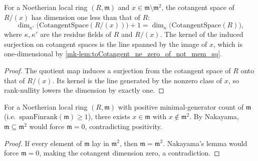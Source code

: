 \begin{lemma}\label{mk-lem:finrank_cotangentSpace_quot_span_singleton_succ}
  \leanok

  For a Noetherian local ring \((R, \mathfrak m)\) and \(x \in \mathfrak m \setminus \mathfrak m^2\),
  the cotangent space of \(R / (x)\) has dimension one less than that of \(R\):
  \[
    \dim_{\kappa'}\!\bigl(\text{CotangentSpace}(R/(x))\bigr) + 1
      = \dim_{\kappa}\!\bigl(\text{CotangentSpace}(R)\bigr),
  \]
  where \(\kappa, \kappa'\) are the residue fields of \(R\) and \(R/(x)\). The kernel of
  the induced surjection on cotangent spaces is the line spanned by the image of \(x\),
  which is one-dimensional by \ref{mk-lem:toCotangent_ne_zero_of_not_mem_sq}.
\end{lemma}
\begin{proof}
  \leanok

The quotient map induces a surjection from the cotangent space of
  \(R\) onto that of \(R/(x)\). Its kernel is the line generated by the
  nonzero class of \(x\), so rank-nullity lowers the dimension by exactly one.
\end{proof}

\begin{lemma}\label{mk-lem:exists_notMemSq_of_spanFinrank_pos}
  \leanok

  For a Noetherian local ring \((R, \mathfrak m)\) with positive minimal-generator count
  of \(\mathfrak m\) (i.e.\ \(\text{spanFinrank}(\mathfrak m) \geq 1\)), there exists
  \(x \in \mathfrak m\) with \(x \notin \mathfrak m^2\). By Nakayama, \(\mathfrak m \subseteq \mathfrak m^2\)
  would force \(\mathfrak m = 0\), contradicting positivity.
\end{lemma}
\begin{proof}
  \leanok

If every element of \(\mathfrak m\) lay in \(\mathfrak m^2\), then
  \(\mathfrak m=\mathfrak m^2\). Nakayama's lemma would force
  \(\mathfrak m=0\), making the cotangent dimension zero, a contradiction.
\end{proof}

